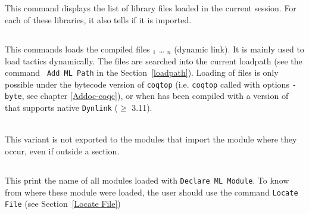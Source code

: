 \subsection[\tt Print Libraries.]{}

This command displays the list of library files loaded in the current
{\Coq} session. For each of these libraries, it also tells if it is
imported.

\subsection[\tt Declare ML Module {\str$_1$} .. {\str$_n$}.]{}
This commands loads the {\ocaml} compiled files {\str$_1$} {\ldots}
{\str$_n$} (dynamic link). It is mainly used to load tactics
dynamically.
 The files are
searched into the current {\ocaml} loadpath (see the command {\tt
Add ML Path} in the Section~\ref{loadpath}).  Loading of {\ocaml}
files is only possible under the bytecode version of {\tt coqtop}
(i.e. {\tt coqtop} called with options {\tt -byte}, see chapter 
\ref{Addoc-coqc}), or when {\Coq} has been compiled with a version of
{\ocaml} that supports native {\tt Dynlink} ($\ge$ 3.11).

\begin{Variants}
\item {}\\
  This variant is not exported to the modules that import the module
  where they occur, even if outside a section.
\end{Variants}

\begin{ErrMsgs}
\item {}
\item {}
\end{ErrMsgs}

\subsection[\tt Print ML Modules.]{}
This print the name of all \ocaml{} modules loaded with \texttt{Declare
  ML Module}. To know from where these module were loaded, the user
should use the command \texttt{Locate File} (see Section~\ref{Locate File})

